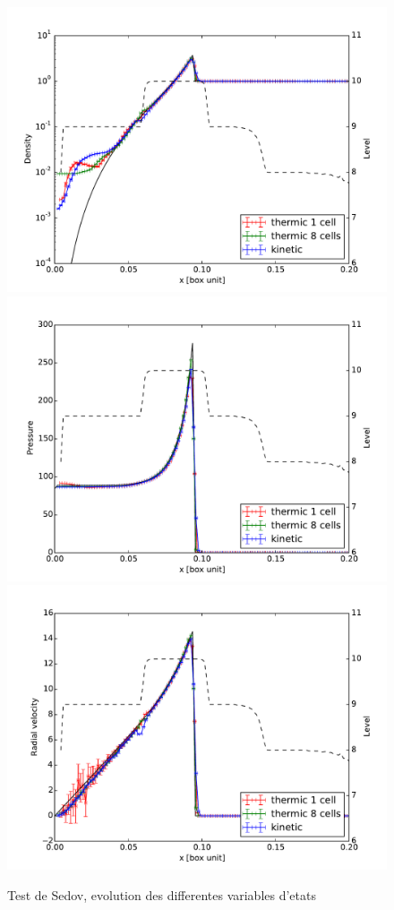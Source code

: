 \begin{figure}[bth]
        \includegraphics[width=.95\linewidth]{img/03/sedov/sedov_comp_profile_den.pdf} 
		\includegraphics[width=.95\linewidth]{img/03/sedov/sedov_comp_profile_pres.pdf} 
		\includegraphics[width=.95\linewidth]{img/03/sedov/sedov_comp_profile_vel.pdf} 
        \caption{Test de Sedov, evolution des differentes variables d'etats}
 		\label{fig:}
\end{figure}




